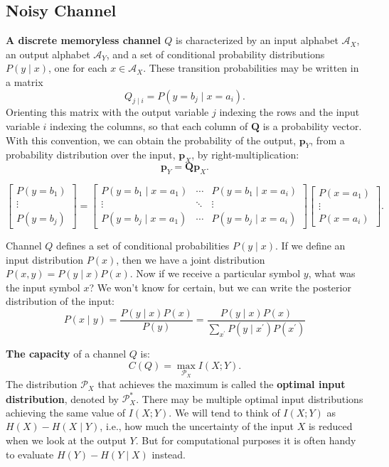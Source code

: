 \documentclass[11pt]{article}
\begin{document}
\subsection{Noisy Channel}

\textbf{A discrete memoryless channel $Q$} is characterized by an input alphabet
$\mathcal{A}_X$, an output alphabet $\mathcal{A}_Y$, and a set of conditional
probability distributions $P(y\mid x)$, one for each $x\in\mathcal{A}_X$. These transition probabilities may be written in a matrix
\[
  Q_{j\mid i} = P(y=b_j\mid x=a_i).
\]
Orienting this matrix with the output variable $j$ indexing the rows and
the input variable $i$ indexing the columns, so that each column of $\mathbf{Q}$
is a probability vector. With this convention, we can obtain the probability of
the output, $\mathbf{p}_Y$, from a probability distribution over the input,
$\mathbf{p}_X$, by right-multiplication:
\[
  \mathbf{p}_Y = \mathbf{Q}\mathbf{p}_X.
\]

\[
  \begin{bmatrix}
    P(y=b_1)\\
    \vdots\\
    P(y=b_j)
  \end{bmatrix}
  =
  \begin{bmatrix}
    P(y=b_1\mid x=a_1) & \cdots & P(y=b_1\mid x=a_i)\\
    \vdots & \ddots & \vdots\\
    P(y=b_j\mid x=a_1) & \cdots & P(y=b_j\mid x=a_i)
  \end{bmatrix}
  \begin{bmatrix}
    P(x=a_1)\\
    \vdots\\
    P(x=a_i)
  \end{bmatrix}.
\]

Channel $Q$ defines a set of conditional probabilities $P(y\mid x)$. If we define an input distribution $P(x)$, then we have a joint distribution $P(x,y) = P(y\mid x)P(x) $. Now if we receive a particular symbol $y$, what was the input symbol $x$? We won't know for certain, but we can write the posterior distribution of the input:
\[P(x\mid y) = \frac{P(y\mid x)P(x) }{P(y)} = \frac{P(y\mid x)P(x) }{\sum_{x^{\prime}} P(y\mid x^{\prime})P(x^{\prime})} \]

\textbf{The capacity} of a channel $Q$ is:
\[
  C(Q) = \max_{\mathcal{P}_X} I(X;Y).
\]
The distribution $\mathcal{P}_X$ that achieves the maximum is called the
\textbf{optimal input distribution}, denoted by $\mathcal{P}_X^{*}$. There may be
multiple optimal input distributions achieving the same value of $I(X;Y)$. We will tend to think of $I(X;Y)$ as $H(X)-H(X\mid Y)$, i.e., how much the uncertainty of the input $X$ is reduced when we look at the output $Y$. But for computational purposes it is often handy to evaluate $H(Y)-H(Y\mid X)$ instead.
\end{document}
